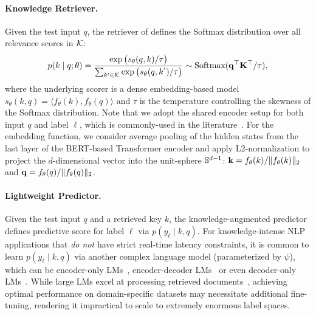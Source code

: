 \paragraph{Knowledge Retriever.}
Given the test input $q$, the retriever of \RAEXMC defines the Softmax distribution over all relevance scores in ${\mathcal{K}}$: 
\begin{equation}
    p(k  \mid  q; \theta)
    = \frac{ \exp\big( s_\theta(q, k) / \tau \big) }{ \sum_{k' \in {\mathcal{K}}} \exp\big( s_\theta(q, k^{'}) / \tau \big) }
    \sim \text{Softmax}({\mathbf{q}}^\top {\mathbf{K}}^\top  / \tau),    
\end{equation}
where the underlying scorer is a dense embedding-based model
$s_{\theta}(k, q) = \langle f_\theta(k), f_\theta(q) \rangle$
and $\tau$ is the temperature controlling the skewness of the Softmax distribution.
Note that we adopt the shared encoder setup for both input $q$ and label $\ell$,
which is commonly-used in the \XMC literature~\citep{dahiya2023ngame,dahiya2023deep,gupta2024dual}.
For the embedding function, we consider average pooling of the hidden states from the last layer of the BERT-based Transformer encoder and apply L2-normalization to project the $d$-dimensional vector into the unit-sphere ${\mathbb{S}}^{d-1}$:
${\mathbf{k}} = f_\theta(k) / \| f_\theta(k) \|_2$ and 
${\mathbf{q}} = f_\theta(q) / \| f_\theta(q) \|_2$.


\paragraph{Lightweight Predictor.}
Given the test input $q$ and a retrieved key $k$, the knowledge-augmented predictor defines predictive score for label $\ell$ via $p(y_\ell \mid k, q)$.
For knowledge-intense NLP applications that \textit{do not} have strict real-time latency constraints, it is common to learn $p(y_\ell  \mid  k, q)$ via another complex language model (parameterized by $\psi$), which can be encoder-only LMs~\citep{guu2020retrieval}, encoder-decoder LMs~\citep{lewis2020retrieval,izacard2023atlas} or even decoder-only LMs~\citep{borgeaud2022improving}.
While large LMs excel at processing retrieved documents~\citep{gao2024retrievalaugmented},
achieving optimal performance on domain-specific \XMC datasets may necessitate additional fine-tuning, rendering it impractical to scale to extremely enormous label spaces.


